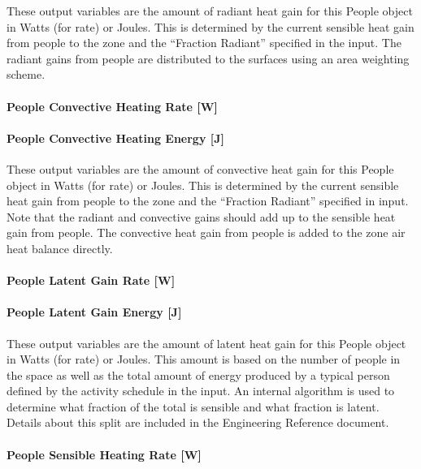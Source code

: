 These output variables are the amount of radiant heat gain for this People object in Watts (for rate) or Joules. This is determined by the current sensible heat gain from people to the zone and the ``Fraction Radiant'' specified in the input. The radiant gains from people are distributed to the surfaces using an area weighting scheme.

\paragraph{People Convective Heating Rate {[}W{]}}\label{people-convective-heating-rate-w}

\paragraph{People Convective Heating Energy {[}J{]}}\label{people-convective-heating-energy-j}

These output variables are the amount of convective heat gain for this People object in Watts (for rate) or Joules. This is determined by the current sensible heat gain from people to the zone and the ``Fraction Radiant'' specified in input. Note that the radiant and convective gains should add up to the sensible heat gain from people. The convective heat gain from people is added to the zone air heat balance directly.

\paragraph{People Latent Gain Rate {[}W{]}}\label{people-latent-gain-rate-w}

\paragraph{People Latent Gain Energy {[}J{]}}\label{people-latent-gain-energy-j}

These output variables are the amount of latent heat gain for this People object in Watts (for rate) or Joules. This amount is based on the number of people in the space as well as the total amount of energy produced by a typical person defined by the activity schedule in the input. An internal algorithm is used to determine what fraction of the total is sensible and what fraction is latent. Details about this split are included in the Engineering Reference document.

\paragraph{People Sensible Heating Rate {[}W{]}}\label{people-sensible-heating-rate-w}

